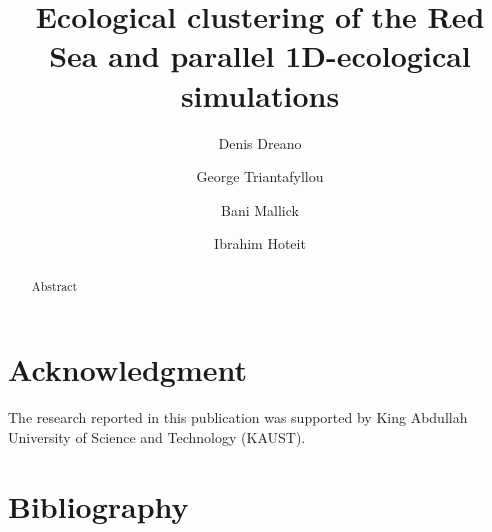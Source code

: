 \documentclass[review, authoryear]{elsarticle}
\begin{document}
\begin{frontmatter}

  \title{Ecological clustering of the Red Sea and parallel 1D-ecological simulations}

  \author[1]{Denis Dreano}

  \author[3]{George Triantafyllou}

  \author[2]{Bani Mallick}
  
  \author[1]{Ibrahim Hoteit}
   


  \address[1]{Computer, Electrical and Mathematical Sciences and Engineering Division, King Abdullah University of Science and Technology}

  \address[2]{Department of Statistics, Texas A\&M University}

  \address[3]{Hellenic Center for Marine Research}

  \begin{abstract}
  Abstract
  \end{abstract}

\end{frontmatter}

\linenumbers











\section*{Acknowledgment}

The research reported in this publication was supported by King Abdullah
University of Science and Technology (KAUST).

\section{Bibliography}

 
\end{document}
